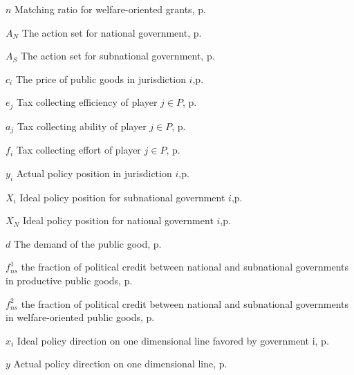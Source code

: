 \begin{eqlist}
    \item[$n$]
    Matching ratio for welfare-oriented grants, p.~\pageref{generalandcategorical}

    \item[$A_N$]
    The action set for national government, p.~\pageref{generalandcategorical}

    \item[$A_S$]
    The action set for subnational government, p.~\pageref{generalandcategorical}

    \item[$c_i$]
    The price of public goods in jurisdiction $i$,p.~\pageref{priceandeffort}

    \item[$e_j$]
    Tax collecting efficiency of player $j \in P$, p.~\pageref{priceandeffort}

    \item[$a_j$]
    Tax collecting ability of player $j \in P$, p.~\pageref{priceandeffort}

    \item[$f_i$]
    Tax collecting effort of player $j \in P$, p.~\pageref{priceandeffort}

    \item[$y_i$]
    Actual policy position in jurisdiction $i$,p.~\pageref{actposition}

    \item[$X_i$]
    Ideal policy position for subnational government $i$,p.~\pageref{iposition}

    \item[$X_N$]
    Ideal policy position for national government $i$,p.~\pageref{actposition}

    \item[$d$]
    The demand of the public good, p.~\pageref{demand}

    \item[$f^1_{ns}$]
    the fraction of political credit between national and subnational governments in productive public goods, p.~\pageref{demand}

    \item[$f^2_{ns}$]
    the fraction of political credit between national and subnational governments in welfare-oriented public goods, p.~\pageref{demand}

    \item[$x_i$]
    Ideal policy direction on one dimensional line favored by government i, p.~\pageref{demand}

    \item[$y$]
    Actual policy direction on one dimensional line, p.~\pageref{demand}

\end{eqlist}
